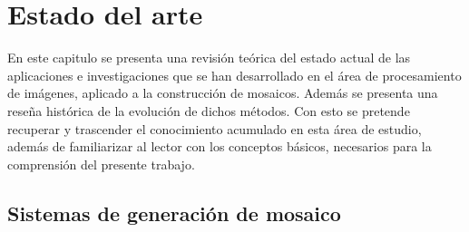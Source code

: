 \chapter{Estado del arte}
\label{capitulo2}

En este capitulo se presenta una revisión teórica del estado actual de las aplicaciones e investigaciones que se han desarrollado en el área de procesamiento de imágenes, aplicado a la construcción de mosaicos. Además se presenta una reseña histórica de la evolución de dichos métodos. Con esto se pretende recuperar y trascender el conocimiento acumulado en esta área de estudio, además de familiarizar al lector con los conceptos básicos, necesarios para la comprensión del presente trabajo.

\section{Sistemas de generación de mosaico}


